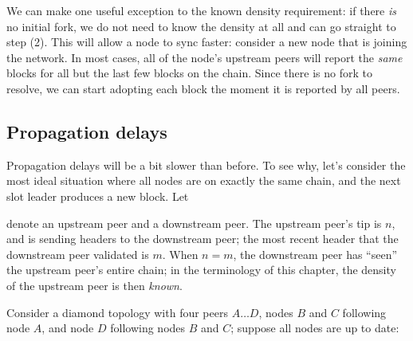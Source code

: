 We can make one useful exception to the known density requirement:
if there \emph{is} no initial fork, we do not need to know the density at
all and can go straight to step (2). This will allow a node to sync faster:
consider a new node that is joining the network. In most cases, all of the
node's upstream peers will report the \emph{same} blocks for all but the last
few blocks on the chain. Since there is no fork to resolve, we can start
adopting each block the moment it is reported by all peers.

\subsection{Propagation delays}

Propagation delays will be a bit slower than before. To see why, let's consider
the most ideal situation where all nodes are on exactly the same chain, and
the next slot leader produces a new block. Let
%
\begin{center}
\end{center}
%
denote an upstream peer and a downstream peer. The upstream peer's tip is $n$,
and is sending headers to the downstream peer; the most recent header that the
downstream peer validated is $m$. When $n = m$, the downstream peer has ``seen''
the upstream peer's entire chain; in the terminology of this chapter, the
density of the upstream peer is then \emph{known}.

Consider a diamond topology with four peers $A \ldots D$, nodes $B$ and $C$
following node $A$, and node $D$ following nodes $B$ and $C$; suppose all nodes
are up to date:

\begin{center}
\end{center}

